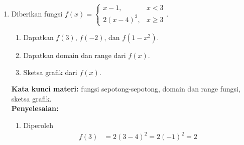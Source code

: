 \documentclass[10pt,openany,a4paper]{article}
\theoremstyle{definition}
\theoremstyle{definition}
\theoremstyle{plain}
\newenvironment{jawab}[2][tes]{
\textbf{Kata kunci materi:} #1.\\
\textbf{Penyelesaian:} #2
}{}
\begin{document}
\begin{enumerate}
\begin{jawab}[jarak titik, persamaan lingkaran]
{\begin{enumerate}
\begin{align*}
                    \end{align*}
                    Dengan substitusi $(x_1,y_1)=(1,3)$ dan $(x_2,y_2)=(7,11)$, diperoleh
                    \begin{align*}
                        (a,b) = \left(\frac{1+7}{2}, \frac{3+11}{2}\right) = \left(\frac{8}{2}, \frac{14}{2}\right) = (4,7).
                    \end{align*}
                    Jadi pusat lingkaran adalah $(4,7)$ dan jari-jarinya adalah $5$. Persamaan lingkaran dengan pusat $(a,b)$ dan jari-jari $r$ adalah
                    \begin{align*}
                        (x-a)^2 + (y-b)^2 = r^2.
                    \end{align*}
                    Dengan substitusi $(a,b)=(4,7)$ dan $r=5$, diperoleh
                    \begin{align*}
                        (x-4)^2 + (y-7)^2 = 5^2 = 25
                    \end{align*}
                    Jadi persamaan lingkaran yang diameternya adalah jarak titik $(1,3)$ ke $(7,11)$ adalah $$\colorlet{oldcolor}{.}
        \color{red}
        \setlength{\fboxrule}{1pt} \boxed{\color{oldcolor}(x-4)^2 + (y-7)^2 = 25}\color{oldcolor}.$$
                \end{enumerate}
            }
            \end{jawab}
            \item Diberikan fungsi $f(x)=\begin{cases}
                x-1, &x<3\\
                2(x-4)^2, &x\geq 3
            \end{cases}$.
            \begin{enumerate}
                \item Dapatkan $f(3)$, $f(-2)$, dan $f(1-x^2)$.
                \item Dapatkan domain dan range dari $f(x)$.
                \item Sketsa grafik dari $f(x)$.
            \end{enumerate}
            \begin{jawab}[fungsi sepotong-sepotong, domain dan range fungsi, sketsa grafik]{
                \begin{enumerate}
                    \item Diperoleh
                    \begin{align*}
                        f(3) &= 2(3-4)^2 = 2(-1)^2 = 2\\

\end{align*}
\end{enumerate}}
\end{jawab}
\end{enumerate}
\end{document}

